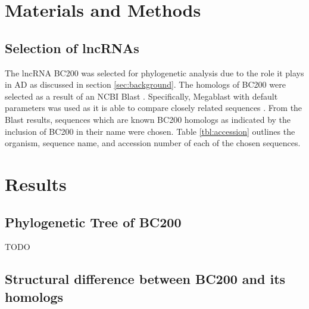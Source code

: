 \documentclass[conference]{IEEEtran}
\begin{document}
\section{Materials and Methods}\label{sec:methods}

\subsection{Selection of lncRNAs}
The lncRNA BC200 was selected for phylogenetic analysis due to the role it plays in AD as discussed in section \ref{sec:background}. 
The homologs of BC200 were selected as a result of an NCBI Blast \cite{blastTool}. Specifically, Megablast \cite{morgulis2008database} with default parameters was used as it is able to compare closely related sequences \cite{amirmahani2018phylogenetic}. 
From the Blast results, sequences which are known BC200 homologs as indicated by the inclusion of BC200 in their name were chosen. 
Table \ref{tbl:accession} outlines the organism, sequence name, and accession number of each of the chosen sequences. 



\section{Results}\label{sec:results}

\subsection{Phylogenetic Tree of BC200}
TODO

\subsection{Structural difference between BC200 and its homologs}
\end{document}
